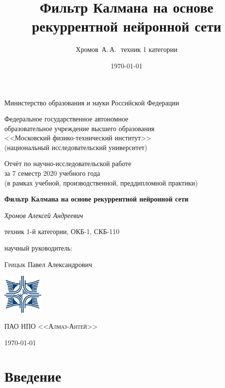 \documentclass[a4paper,11pt]{article} %
\author{Хромов~А.\,А.\,~техник 1 категории}
\title{Фильтр Калмана на основе рекуррентной нейронной сети}
\date{\today}
\begin{document}
	\begin{titlepage}
		\centering
		{\large Министерство образования и науки Российской Федерации}
		
		{\large Федеральное государственное автономное \\ образовательное учреждение высшего образования \\
			<<Московский физико-технический институт>> \\
			(национальный исследовательский университет)
		}
		
		\vspace{1cm}
		{\large Отчёт по научно-исследовательской работе \\ за 7 семестр 2020 учебного года \\ (в рамках учебной, производственной, преддипломной практики)\par}
		\vspace{1.5cm}
		{\huge\bfseries Фильтр Калмана на основе рекуррентной нейронной сети\par}
		\vspace{2cm}
		{\Large\itshape  Хромов Алексей Андреевич\par}
		техник 1-й категории, ОКБ-1, СКБ-110
		\vfill
		
		
		научный руководитель:\par
		\textsc{Грицык} Павел Александрович
				
		\vfill
		
		\includegraphics[width=0.15\textwidth]{almaz}\par\vspace{1cm}
		{\scshape\Large ПАО НПО <<Алмаз-Антей>> \par}
		
		\vfill
		{\large \today\par}
	\end{titlepage}



\tableofcontents

\newpage

\section{Введение}
\end{document}
